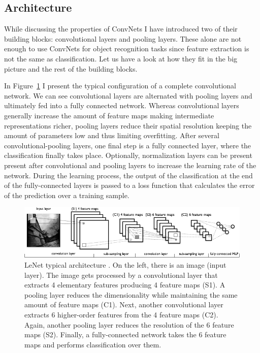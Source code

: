 \subsection{Architecture}
\label{sub:theory:convnets:achitecture}

While discussing the properties of ConvNets I have introduced two of their building blocks: convolutional layers and pooling layers.
These alone are not enough to use ConvNets for object recognition tasks since feature extraction is not the same as classification.
Let us have a look at how they fit in the big picture and the rest of the building blocks.

In Figure~\ref{fig:sec:theory:convnet} I present the typical configuration of a complete convolutional network.
We can see convolutional layers are alternated with pooling layers and ultimately fed into a fully connected network.
Whereas convolutional layers generally increase the amount of feature maps making intermediate representations richer, pooling layers reduce their spatial resolution keeping the amount of parameters low and thus limiting overfitting.
After several convolutional-pooling layers, one final step is a fully connected layer, where the classification finally takes place.
Optionally, normalization layers can be present present after convolutional and pooling layers to increase the learning rate of the network.
During the learning process, the output of the classification at the end of the fully-connected layers is passed to a loss function that calculates the error of the prediction over a training sample.

\begin{figure}[htb]
  \begin{center}
    \includegraphics[width=\textwidth]{gfx/conv-network}
  \end{center}
  \caption{LeNet typical architecture \cite{Lisa2010}.
    On the left, there is an image (input layer).
    The image gets processed by a convolutional layer that extracts 4 elementary features producing 4 feature maps (S1).
    A pooling layer reduces the dimensionality while maintaining the same amount of feature maps (C1).
    Next, another convolutional layer extracts 6 higher-order features from the 4 feature maps (C2).
    Again, another pooling layer reduces the resolution of the 6 feature maps (S2).
    Finally, a fully-connected network takes the 6 feature maps and performs classification over them.}
  \label{fig:sec:theory:convnet}
\end{figure}

